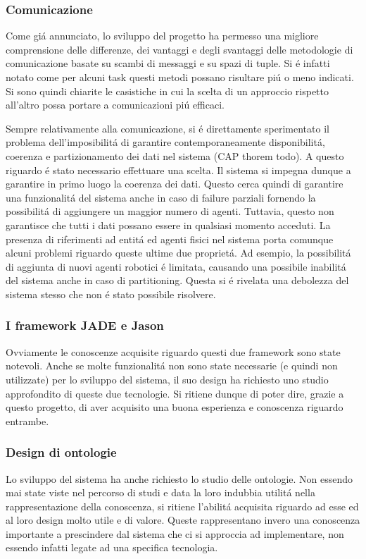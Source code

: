 \subsubsection{Comunicazione}
Come gi\'a annunciato, lo sviluppo del progetto ha permesso una migliore comprensione delle differenze, dei vantaggi e degli svantaggi delle metodologie di comunicazione basate su scambi di messaggi e su spazi di tuple. Si \'e infatti notato come per alcuni task questi metodi possano risultare pi\'u o meno indicati. Si sono quindi chiarite le casistiche in cui la scelta di un approccio rispetto all'altro possa portare a comunicazioni pi\'u efficaci.

\parag
Sempre relativamente alla comunicazione, si \'e direttamente sperimentato il problema dell'imposibilit\'a di garantire contemporaneamente disponibilit\'a, coerenza e partizionamento dei dati nel sistema (CAP thorem todo). A questo riguardo \'e stato necessario effettuare una scelta. Il sistema si impegna dunque a garantire in primo luogo la coerenza dei dati. Questo cerca quindi di garantire una funzionalit\'a del sistema anche in caso di failure parziali fornendo la possibilit\'a di aggiungere un maggior numero di agenti. Tuttavia, questo non garantisce che tutti i dati possano essere in qualsiasi momento acceduti.
La presenza di riferimenti ad entit\'a ed agenti fisici nel sistema porta comunque alcuni problemi riguardo queste ultime due propriet\'a. Ad esempio, la possibilit\'a di aggiunta di nuovi agenti robotici \'e limitata, causando una possibile inabilit\'a del sistema anche in caso di partitioning. Questa si \'e rivelata una debolezza del sistema stesso che non \'e stato possibile risolvere.

\subsubsection{I framework JADE e Jason}
Ovviamente le conoscenze acquisite riguardo questi due framework sono state notevoli. Anche se molte funzionalit\'a non sono state necessarie (e quindi non utilizzate) per lo sviluppo del sistema, il suo design ha richiesto uno studio approfondito di queste due tecnologie. Si ritiene dunque di poter dire, grazie a questo progetto, di aver acquisito una buona esperienza e conoscenza riguardo entrambe. 

\subsubsection{Design di ontologie}
Lo sviluppo del sistema ha anche richiesto lo studio delle ontologie. Non essendo mai state viste nel percorso di studi e data la loro indubbia utilit\'a nella rappresentazione della conoscenza, si ritiene l'abilit\'a acquisita riguardo ad esse ed al loro design molto utile e di valore. Queste rappresentano invero una conoscenza importante a prescindere dal sistema che ci si approccia ad implementare, non essendo infatti legate ad una specifica tecnologia.

